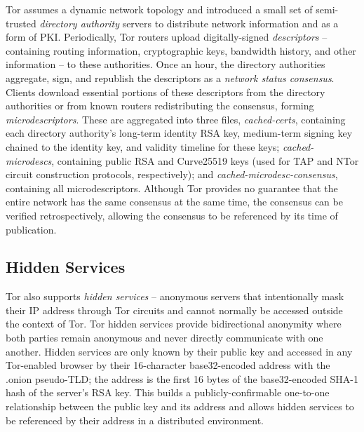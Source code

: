 \documentclass{sig-alternate}
\begin{document}
Tor assumes a dynamic network topology and introduced a small set of semi-trusted \textit{directory authority} servers to distribute network information and as a form of PKI. Periodically, Tor routers upload digitally-signed \textit{descriptors} -- containing routing information, cryptographic keys, bandwidth history, and other information -- to these authorities. Once an hour, the directory authorities aggregate, sign, and republish the descriptors as a \textit{network status consensus}. Clients download essential portions of these descriptors from the directory authorities or from known routers redistributing the consensus, forming \textit{microdescriptors}. These are aggregated into three files, \textit{cached-certs}, containing each directory authority's long-term identity RSA key, medium-term signing key chained to the identity key, and validity timeline for these keys; \textit{cached-microdescs}, containing public RSA and Curve25519\cite{bernstein2006curve25519} keys (used for TAP\cite{goldberg2006security} and NTor\cite{goldberg2013anonymity} circuit construction protocols, respectively); and \textit{cached-microdesc-consensus}, containing all microdescriptors. Although Tor provides no guarantee that the entire network has the same consensus at the same time, the consensus can be verified retrospectively, allowing the consensus to be referenced by its time of publication.

\subsection{Hidden Services} %

Tor also supports \emph{hidden services} -- anonymous servers that intentionally mask their IP address through Tor circuits and cannot normally be accessed outside the context of Tor. Tor hidden services provide bidirectional anonymity where both parties remain anonymous and never directly communicate with one another. Hidden services are only known by their public key and accessed in any Tor-enabled browser by their 16-character base32-encoded address with the .onion pseudo-TLD; the address is the first 16 bytes of the base32-encoded SHA-1 hash of the server's RSA key. This builds a publicly-confirmable one-to-one relationship between the public key and its address and allows hidden services to be referenced by their address in a distributed environment.
\end{document}
